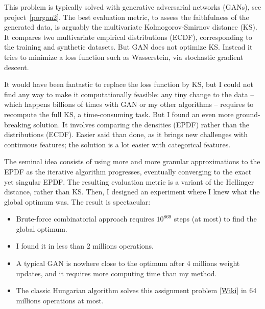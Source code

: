 \documentclass[oneside,10pt]{book}
\begin{document}
This problem is typically solved with generative adversarial networks (\textcolor{index}{GANs}),
 see project~\ref{porgan2}. The best evaluation metric, to assess the faithfulness of the generated data,
 is arguably the 
\textcolor{index}{multivariate Kolmogorov-Smirnov distance} (KS). 
It compares two multivariate empirical distributions 
(\textcolor{index}{ECDF}), corresponding to  the training and synthetic datasets. But GAN does not optimize KS. Instead it tries to minimize a loss function such as 
\textcolor{index}{Wasserstein}, via 
\textcolor{index}{stochastic gradient descent}. 

It would have been fantastic to replace the loss function by KS, but I could not find any way to make it computationally feasible: any tiny
 change to the data -- which happens billions of times with GAN or my other algorithms -- requires to recompute the full KS, a time-consuming task. 
But I found an even more ground-breaking solution. It involves comparing the densities 
(\textcolor{index}{EPDF}) rather than 
the distributions (\textcolor{index}{ECDF}). Easier said than done, as it brings new challenges with continuous features; the solution is a lot easier 
 with categorical features.

The seminal idea consists of using more and more granular approximations to the EPDF as the iterative algorithm progresses, eventually converging to the exact yet
 singular EPDF. The resulting evaluation metric is a variant of the 
\textcolor{index}{Hellinger distance}, rather than KS. Then, I designed an experiment where I knew what the global optimum was. The result is spectacular: 
\vspace{1ex}
\begin{itemize}
\item Brute-force combinatorial approach
 requires $10^{869}$ steps (at most) to find the global optimum. 
\item I found it in less than 2 millions operations. 
\item A typical GAN is nowhere close to the
 optimum after 4 millions weight updates, and it requires more computing time than my method. 
\item The classic \textcolor{index}{Hungarian algorithm} solves this assignment problem [\href{https://en.wikipedia.org/wiki/Assignment_problem}{Wiki}] in 64 millions operations at most. 
\end{itemize}
\vspace{1ex}
\end{document}
